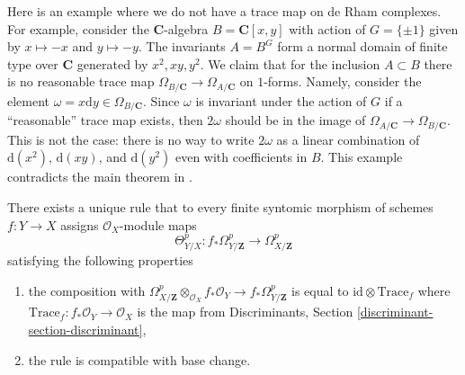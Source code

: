 \begin{example}
\label{example-no-trace}
Here is an example where we do not have a trace map on de Rham complexes.
For example, consider the $\mathbf{C}$-algebra $B = \mathbf{C}[x, y]$ with
action of $G = \{\pm 1\}$ given by $x \mapsto -x$ and $y \mapsto -y$.
The invariants $A = B^G$ form a normal domain of finite type over $\mathbf{C}$
generated by $x^2, xy, y^2$. We claim that for the inclusion $A \subset B$
there is no reasonable trace map
$\Omega_{B/\mathbf{C}} \to \Omega_{A/\mathbf{C}}$
on $1$-forms. Namely, consider the element
$\omega = x \text{d} y \in \Omega_{B/\mathbf{C}}$.
Since $\omega$ is invariant under the action of $G$ if a ``reasonable''
trace map exists, then $2\omega$ should be in the image of
$\Omega_{A/\mathbf{C}} \to \Omega_{B/\mathbf{C}}$. This is
not the case: there is no way to write $2\omega$ as a linear
combination of $\text{d}(x^2)$, $\text{d}(xy)$, and $\text{d}(y^2)$
even with coefficients in $B$.
This example contradicts the main theorem in
\cite{Zannier}.
\end{example}

\begin{lemma}
\label{lemma-Garel}
There exists a unique rule that to every finite syntomic
morphism of schemes $f : Y \to X$ assigns $\mathcal{O}_X$-module maps
$$
\Theta^p_{Y/X} :
f_*\Omega^p_{Y/\mathbf{Z}}
\longrightarrow
\Omega^p_{X/\mathbf{Z}}
$$
satisfying the following properties
\begin{enumerate}
\item the composition with
$\Omega^p_{X/\mathbf{Z}} \otimes_{\mathcal{O}_X} f_*\mathcal{O}_Y
\to f_*\Omega^p_{Y/\mathbf{Z}}$ is equal to
$\text{id} \otimes \text{Trace}_f$
where $\text{Trace}_f : f_*\mathcal{O}_Y \to \mathcal{O}_X$
is the map from
Discriminants, Section \ref{discriminant-section-discriminant},
\item the rule is compatible with base change.
\end{enumerate}
\end{lemma}

